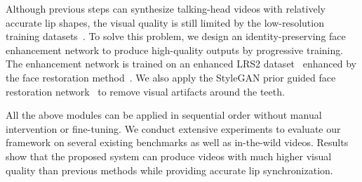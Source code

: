 Although previous steps can synthesize talking-head videos with relatively accurate lip shapes, the visual quality is still limited by the low-resolution training  datasets~\cite{voxceleb,lrs2}. 
To solve this problem, we design an identity-preserving face enhancement network to produce high-quality outputs by  progressive training. 
The enhancement network is trained on an enhanced LRS2 dataset~\cite{lrs2} enhanced by the face restoration method~\cite{gpen}. We also apply the StyleGAN prior guided face restoration network~\cite{gfpgan} to remove visual artifacts around the teeth.

All the above modules can be applied in sequential order without manual intervention or fine-tuning. 
We conduct extensive experiments to evaluate our framework on several existing benchmarks as well as in-the-wild videos.  
Results show that the proposed system can produce videos with much higher visual quality than previous methods while providing accurate lip synchronization.


